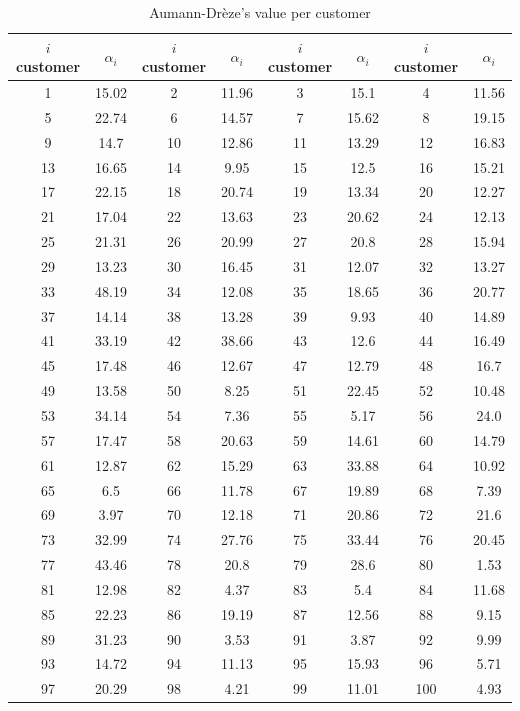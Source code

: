 \begin{table}[H]
	\centering
	\begin{tabular}{c| c |c |c |c|c|c|c}
		\hline 
		$i$ customer & $\alpha_i$ & $i$ customer & $\alpha_i$ & $i$ customer & $\alpha_i$& $i$ customer & $\alpha_i$\\
		\hline
		
		1 & 15.02 & 2 & 11.96 & 3 & 15.1 & 4 & 11.56 \\
		5 & 22.74 & 6 & 14.57 & 7 & 15.62 & 8 & 19.15 \\
		9 & 14.7 & 10 & 12.86 & 11 & 13.29 & 12 & 16.83 \\
		13 & 16.65 & 14 & 9.95 & 15 & 12.5 & 16 & 15.21 \\
		17 & 22.15 & 18 & 20.74 & 19 & 13.34 & 20 & 12.27 \\
		21 & 17.04 & 22 & 13.63 & 23 & 20.62 & 24 & 12.13 \\
		25 & 21.31 & 26 & 20.99 & 27 & 20.8 & 28 & 15.94 \\
		29 & 13.23 & 30 & 16.45 & 31 & 12.07 & 32 & 13.27 \\
		33 & 48.19 & 34 & 12.08 & 35 & 18.65 & 36 & 20.77 \\
		37 & 14.14 & 38 & 13.28 & 39 & 9.93 & 40 & 14.89 \\
		41 & 33.19 & 42 & 38.66 & 43 & 12.6 & 44 & 16.49 \\
		45 & 17.48 & 46 & 12.67 & 47 & 12.79 & 48 & 16.7 \\
		49 & 13.58 & 50 & 8.25 & 51 & 22.45 & 52 & 10.48 \\
		53 & 34.14 & 54 & 7.36 & 55 & 5.17 & 56 & 24.0 \\
		57 & 17.47 & 58 & 20.63 & 59 & 14.61 & 60 & 14.79 \\
		61 & 12.87 & 62 & 15.29 & 63 & 33.88 & 64 & 10.92 \\
		65 & 6.5 & 66 & 11.78 & 67 & 19.89 & 68 & 7.39 \\
		69 & 3.97 & 70 & 12.18 & 71 & 20.86 & 72 & 21.6 \\
		73 & 32.99 & 74 & 27.76 & 75 & 33.44 & 76 & 20.45 \\
		77 & 43.46 & 78 & 20.8 & 79 & 28.6 & 80 & 1.53 \\
		81 & 12.98 & 82 & 4.37 & 83 & 5.4 & 84 & 11.68 \\
		85 & 22.23 & 86 & 19.19 & 87 & 12.56 & 88 & 9.15 \\
		89 & 31.23 & 90 & 3.53 & 91 & 3.87 & 92 & 9.99 \\
		93 & 14.72 & 94 & 11.13 & 95 & 15.93 & 96 & 5.71 \\
		97 & 20.29 & 98 & 4.21 & 99 & 11.01 & 100 & 4.93 \\
		
		\hline 
	\end{tabular} \
	\caption{Aumann-Dr\`eze's value per customer}
	\label{Aumann value}
\end{table}\

